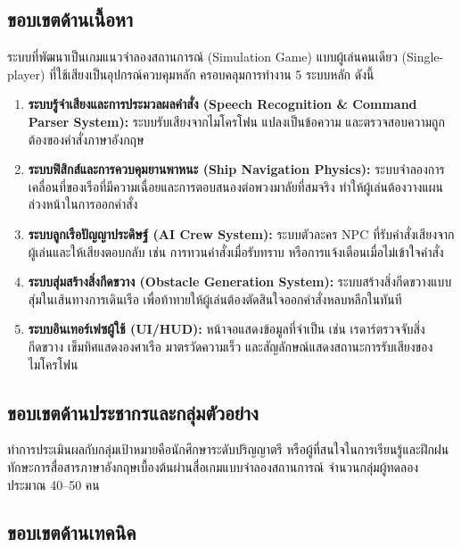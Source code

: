 \subsection{ขอบเขตด้านเนื้อหา}

ระบบที่พัฒนาเป็นเกมแนวจำลองสถานการณ์ (Simulation Game) แบบผู้เล่นคนเดียว (Single-player) ที่ใช้เสียงเป็นอุปกรณ์ควบคุมหลัก ครอบคลุมการทำงาน 5 ระบบหลัก ดังนี้

\begin{enumerate}[label=\arabic*)]
    \item \textbf{ระบบรู้จำเสียงและการประมวลผลคำสั่ง (Speech Recognition \& Command Parser System):} ระบบรับเสียงจากไมโครโฟน แปลงเป็นข้อความ และตรวจสอบความถูกต้องของคำสั่งภาษาอังกฤษ
    \item \textbf{ระบบฟิสิกส์และการควบคุมยานพาหนะ (Ship Navigation Physics):} ระบบจำลองการเคลื่อนที่ของเรือที่มีความเฉื่อยและการตอบสนองต่อพวงมาลัยที่สมจริง ทำให้ผู้เล่นต้องวางแผนล่วงหน้าในการออกคำสั่ง
    \item \textbf{ระบบลูกเรือปัญญาประดิษฐ์ (AI Crew System):} ระบบตัวละคร NPC ที่รับคำสั่งเสียงจากผู้เล่นและให้เสียงตอบกลับ เช่น การทวนคำสั่งเมื่อรับทราบ หรือการแจ้งเตือนเมื่อไม่เข้าใจคำสั่ง
    \item \textbf{ระบบสุ่มสร้างสิ่งกีดขวาง (Obstacle Generation System):} ระบบสร้างสิ่งกีดขวางแบบสุ่มในเส้นทางการเดินเรือ เพื่อท้าทายให้ผู้เล่นต้องตัดสินใจออกคำสั่งหลบหลีกในทันที
    \item \textbf{ระบบอินเทอร์เฟซผู้ใช้ (UI/HUD):} หน้าจอแสดงข้อมูลที่จำเป็น เช่น เรดาร์ตรวจจับสิ่งกีดขวาง เข็มทิศแสดงองศาเรือ มาตรวัดความเร็ว และสัญลักษณ์แสดงสถานะการรับเสียงของไมโครโฟน
\end{enumerate}

\subsection{ขอบเขตด้านประชากรและกลุ่มตัวอย่าง}

ทำการประเมินผลกับกลุ่มเป้าหมายคือนักศึกษาระดับปริญญาตรี หรือผู้ที่สนใจในการเรียนรู้และฝึกฝนทักษะการสื่อสารภาษาอังกฤษเบื้องต้นผ่านสื่อเกมแบบจำลองสถานการณ์ จำนวนกลุ่มผู้ทดลองประมาณ 40–50 คน

\subsection{ขอบเขตด้านเทคนิค}


